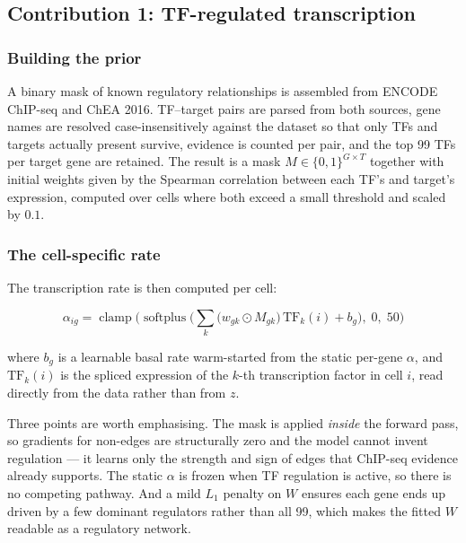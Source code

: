 \documentclass[11pt,a4paper]{article}
\newenvironment{keybox}{\begin{shaded}\noindent}{\end{shaded}}
\newcommand{\softplus}{\operatorname{softplus}}
\theoremstyle{definition}
\begin{document}
\subsection{Contribution 1: TF-regulated transcription}

\subsubsection{Building the prior}

A binary mask of known regulatory relationships is assembled from ENCODE
ChIP-seq and ChEA 2016. TF--target pairs are parsed from both sources, gene
names are resolved case-insensitively against the dataset so that only TFs and
targets actually present survive, evidence is counted per pair, and the top 99
TFs per target gene are retained. The result is a mask
$M \in \{0,1\}^{G \times T}$ together with initial weights given by the
Spearman correlation between each TF's and target's expression, computed over
cells where both exceed a small threshold and scaled by $0.1$.

\subsubsection{The cell-specific rate}

The transcription rate is then computed per cell:
%
\begin{keybox}
\begin{equation}
\alpha_{ig} = \operatorname{clamp}\Big(
\softplus\Big(\textstyle\sum_{k} \big(w_{gk} \odot M_{gk}\big)\, \mathrm{TF}_k(i) + b_g\Big),
\; 0,\; 50 \Big)
\label{eq:tf-alpha}
\end{equation}
\end{keybox}
%
where $b_g$ is a learnable basal rate warm-started from the static per-gene
$\alpha$, and $\mathrm{TF}_k(i)$ is the spliced expression of the $k$-th
transcription factor in cell $i$, read directly from the data rather than from
$z$.

Three points are worth emphasising. The mask is applied \emph{inside} the
forward pass, so gradients for non-edges are structurally zero and the model
cannot invent regulation --- it learns only the strength and sign of edges that
ChIP-seq evidence already supports. The static $\alpha$ is frozen when TF
regulation is active, so there is no competing pathway. And a mild $L_1$
penalty on $W$ ensures each gene ends up driven by a few dominant regulators
rather than all 99, which makes the fitted $W$ readable as a regulatory
network.
\end{document}

